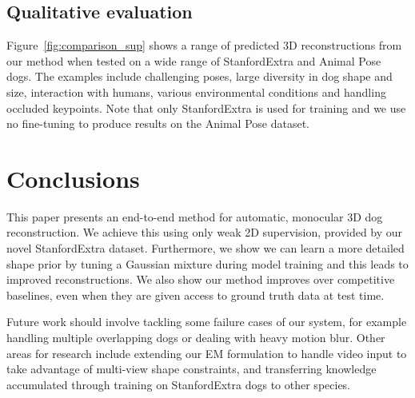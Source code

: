   
  \subsection{Qualitative evaluation}
  
  Figure~\ref{fig:comparison_sup} shows a range of predicted 3D reconstructions from our method when tested on a wide range of StanfordExtra and Animal Pose~\cite{animalpose} dogs. The examples include challenging poses, large diversity in dog shape and size, interaction with humans, various environmental conditions and handling occluded keypoints. Note that only StanfordExtra is used for training and we use no fine-tuning to produce results on the Animal Pose dataset.
  
  \section{Conclusions}
  This paper presents an end-to-end method for automatic, monocular 3D dog reconstruction. We achieve this using only weak 2D supervision, provided by our novel StanfordExtra dataset. Furthermore, we show we can learn a more detailed shape prior by tuning a Gaussian mixture during model training and this leads to improved reconstructions. We also show our method improves over competitive baselines, even when they are given access to ground truth data at test time.
  
  Future work should involve tackling some failure cases of our system, for example handling multiple overlapping dogs or dealing with heavy motion blur. Other areas for research include extending our EM formulation to handle video input to take advantage of multi-view shape constraints, and transferring knowledge accumulated through training on StanfordExtra dogs to other species.
